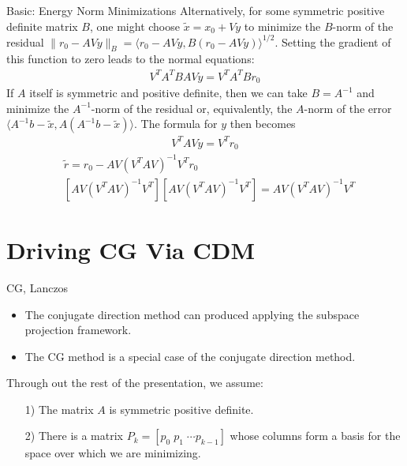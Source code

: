\documentclass{beamer}
\begin{document}
    \begin{frame}{Basic: Energy Norm Minimizations}
            Alternatively, for some symmetric positive definite matrix $B$, one might choose $\tilde{x} = x_0 + Vy$ to minimize 
            the $B$-norm of the residual $\| r_0 - A V y \|_B = \langle r_0 - A V y , B ( r_0 - A V y ) \rangle^{1/2}$.  Setting the gradient of this function to zero leads to the normal equations:
            \begin{align}
                V^T A^T BAVy = V^T A^T B r_0
            \end{align}
            If $A$ itself is symmetric and positive definite, then we can take $B = A^{-1}$ and minimize the $A^{-1}$-norm of the 
            residual or, equivalently, the $A$-norm of the error $\langle A^{-1} b - \tilde{x} , A ( A^{-1} b - \tilde{x} ) \rangle$.
            The formula for $y$ then becomes
            \begin{align}\label{eqn:Energy_Norm_Minimization_Conditions}
                V^T A V y = V^T r_0
            \end{align}
            \begin{align}
                & \tilde{r} = r_0 - A V ( V^T A V )^{-1} V^T r_0
                \\
                & [A V (V^T A V )^{-1} V^T ] [ A V ( V^T A V )^{-1} V^T ] = A V ( V^T A V )^{-1} V^T
            \end{align}
    \end{frame}

\section{Driving CG Via CDM}

    \begin{frame}{CG, Lanczos}
        \begin{itemize}
            \item The conjugate direction method can produced applying the subspace projection framework.
            \item The CG method is a special case of the conjugate direction method. 
        \end{itemize}
        Through out the rest of the presentation, we assume: 
        \begin{itemize}
            \item [1)] The matrix $A$ is symmetric positive definite.  
            \item [2)] There is a matrix $P_k = [p_0 \;p_1\;\cdots p_{k-1}]$ whose columns form a basis for the space over which we are minimizing.
        \end{itemize}
    \end{frame}
    
\end{document}
